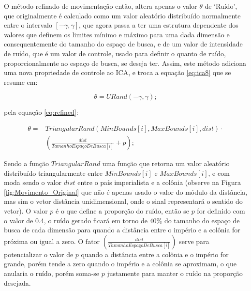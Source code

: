 	O método refinado de movimentação então, altera apenas o valor \(\theta\) de ‘Ruído’, que originalmente é calculado como um valor aleatório distribuído normalmente entre o intervalo \(\left[-\gamma, \gamma\right]\), que agora passa a ter uma estrutura dependente dos valores que definem os limites mínimo e máximo para uma dada dimensão e consequentemente do tamanho do espaço de busca, e de um valor de intensidade de ruído, que é um valor de controle, usado para definir o quanto de ruído, proporcionalmente ao espaço de busca, se deseja ter. Assim, este método adiciona uma nova propriedade de controle ao ICA, e troca a equação \ref{eq:ica8} que se resume em:
    
    \[\theta = URand(-\gamma, \gamma);\]
    
pela equação \ref{eq:refined}:

\begin{equation}
\label{eq:refined}
\begin{split}
\theta = 
& TriangularRand(MinBounds[i], MaxBounds[i], dist) \cdot \\ 
& \left(\frac{dist}{TamanhoEspaçoDeBusca[i]} + p \right);
\end{split}
\end{equation}

Sendo a função \(TriangularRand\) uma função que retorna um valor aleatório distribuído triangularmente entre \(MinBounds[i]\) e \(MaxBounds[i]\), e com moda sendo o valor \(dist\) entre o país imperialista e a colônia (observe na Figura \ref{fig:Movimento_Original} que não é apenas usado o valor do módulo da distância, mas sim o vetor distância unidimensional, onde o sinal representará o sentido do vetor). O valor \(p\) é o que define a proporção do ruído, então se \(p\) for definido com o valor de 0.4, o ruído gerado ficará em torno de 40\% do tamanho do espaço de busca de cada dimensão para quando a distância entre o império e a colônia for próxima ou igual a zero. O fator \(\left(\frac{dist}{TamanhoEspaçoDeBusca[i]}\right)\) serve para potencializar o valor de \(p\) quando a distância entre a colônia e o império for grande, porém tende a zero quando o império e a colônia se aproximam, o que anularia o ruído, porém soma-se \(p\) justamente para manter o ruído na proporção desejada.

